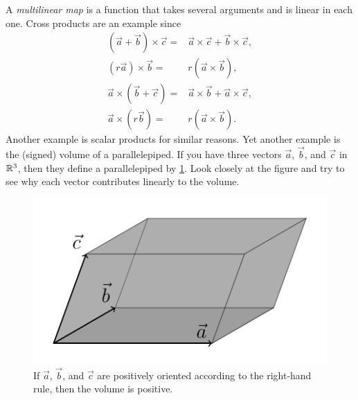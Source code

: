\documentclass[english, 12pt]{article}
\begin{document}
A \emph{multilinear map} is a function that takes several arguments and is linear in each one.
Cross products are an example since
\begin{align*}
	(\vec{a} + \vec{b}) \times \vec{c} ={}& \vec{a} \times \vec{c} + \vec{b} \times \vec{c},\\
	(r \vec{a}) \times \vec{b} ={}& r (\vec{a} \times \vec{b}),\\
	\vec{a} \times (\vec{b} + \vec{c}) ={}& \vec{a} \times \vec{b} + \vec{a} \times \vec{c},\\
	\vec{a} \times (r \vec{b}) ={}& r (\vec{a} \times \vec{b}).
\end{align*}
Another example is scalar products for similar reasons.
Yet another example is the (signed) volume of a parallelepiped.
If you have three vectors \(\vec a\), \(\vec b\), and \(\vec c\) in \(\mathbb{R}^3\), then they define a parallelepiped by \cref{fig:parallelepiped}.
Look closely at the figure and try to see why each vector contributes linearly to the volume.

\begin{figure}[ht]
	\centering
	\includegraphics[]{figures/parallelepiped.pdf}
	\caption{If \(\vec a\), \(\vec b\), and \(\vec c\) are positively oriented according to the right-hand rule, then the volume is positive.}%
	\label{fig:parallelepiped}
\end{figure}
\end{document}
